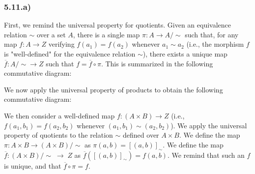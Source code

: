 \subsubsection*{5.11.a)}

First, we remind the universal property for quotients. Given an equivalence relation $\sim$ over a set $A$, there is a single map $\pi : A \to A/\sim$ such that, for any map $f : A \to Z$ verifying $f(a_1) = f(a_2)$ whenever $a_1 \sim a_2$ (i.e., the morphism $f$ is "well-defined" for the equivalence relation $\sim$), there exists a unique map $\overline{f} : A/\sim \to Z$ such that $f = \overline{f} \circ \pi$. This is summarized in the following commutative diagram:


We now apply the universal property of products to obtain the following commutative diagram:


We then consider a well-defined map $f : (A \times B) \to Z$ (i.e., $f(a_1, b_1) = f(a_2, b_2)$ whenever $(a_1, b_1) \sim (a_2, b_2)$). We apply the universal property of quotients to the relation $\sim$ defined over $A \times B$. We define the map $\pi : A \times B \to (A \times B)/\sim$ as $\pi(a,b) = [(a,b)]_\sim$. We define the map $\overline{f} : (A \times B)/\sim \; \to \; Z$ as $\overline{f}([(a,b)]_\sim) = f(a,b)$. We remind that such an $f$ is unique, and that $\overline{f} \circ \pi = f$.

